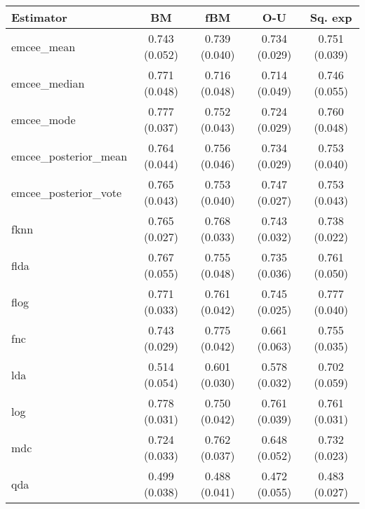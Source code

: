 \begin{table}[ht!]
  \centering
  \begin{tabular}{lcccc}
\toprule
           \textbf{Estimator} &            \textbf{BM} &           \textbf{fBM} &           \textbf{O-U} &        \textbf{Sq. exp} \\
\midrule
          emcee\_mean & 0.743 (0.052) &       0.739 (0.040) &      0.734 (0.029) & 0.751 (0.039) \\
        emcee\_median & 0.771 (0.048) &       0.716 (0.048) &      0.714 (0.049) & 0.746 (0.055) \\
          emcee\_mode & 0.777 (0.037) &       0.752 (0.043) &      0.724 (0.029) & 0.760 (0.048) \\
emcee\_posterior\_mean & 0.764 (0.044) &       0.756 (0.046) &      0.734 (0.029) & 0.753 (0.040) \\
emcee\_posterior\_vote & 0.765 (0.043) &       0.753 (0.040) &      0.747 (0.027) & 0.753 (0.043) \\
                fknn & 0.765 (0.027) &       0.768 (0.033) &      0.743 (0.032) & 0.738 (0.022) \\
                flda & 0.767 (0.055) &       0.755 (0.048) &      0.735 (0.036) & 0.761 (0.050) \\
                flog & 0.771 (0.033) &       0.761 (0.042) &      0.745 (0.025) & 0.777 (0.040) \\
                 fnc & 0.743 (0.029) &       0.775 (0.042) &      0.661 (0.063) & 0.755 (0.035) \\
                 lda & 0.514 (0.054) &       0.601 (0.030) &      0.578 (0.032) & 0.702 (0.059) \\
                 log & 0.778 (0.031) &       0.750 (0.042) &      0.761 (0.039) & 0.761 (0.031) \\
                 mdc & 0.724 (0.033) &       0.762 (0.037) &      0.648 (0.052) & 0.732 (0.023) \\
                 qda & 0.499 (0.038) &       0.488 (0.041) &      0.472 (0.055) & 0.483 (0.027) \\

\bottomrule
\toprule


\end{tabular}
\end{table}

